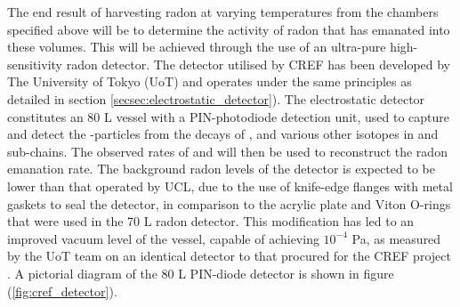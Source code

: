 The end result of harvesting radon at varying temperatures from the chambers specified above will be to determine the activity of radon that has emanated into these volumes. This will be achieved through the use of an ultra-pure high-sensitivity radon detector. The detector utilised by CREF has been developed by The University of Tokyo (UoT) and operates under the same principles as detailed in section \ref{secsec:electrostatic_detector}). The electrostatic detector constitutes an 80 L vessel with a PIN-photodiode detection unit, used to capture and detect the \alpha-particles from the decays of \PoTOE{}, \PoTOF{} and various other isotopes in \RnTTT{} and \RnTTZ{} sub-chains. The observed rates of \PoTOE{} and \PoTOF{} will then be used to reconstruct the radon emanation rate. The background radon levels of the detector is expected to be lower than that operated by UCL, due to the use of knife-edge flanges with metal gaskets to seal the detector, in comparison to the acrylic plate and Viton O-rings that were used in the 70 L radon detector. This modification has led to an improved vacuum level of the vessel, capable of achieving $10^{-4}$ Pa, as measured by the UoT team on an identical detector to that procured for the CREF project \cite{Hosokawa:2015koa}. A pictorial diagram of the 80 L PIN-diode detector is shown in figure (\ref{fig:cref_detector}).
%
